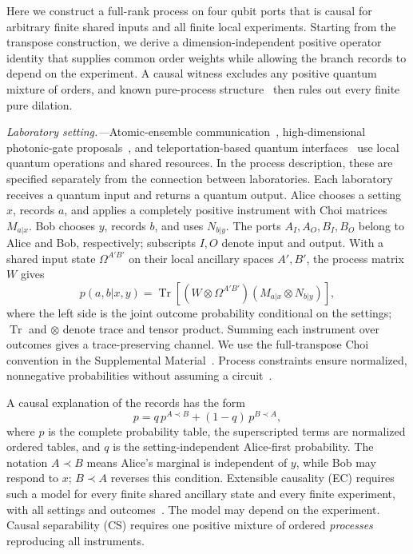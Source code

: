\documentclass[aps,prl,reprint,superscriptaddress,longbibliography,bibnotes,floatfix]{revtex4-2}
\newcommand{\Tr}{\operatorname{Tr}}
\begin{document}
Here we construct a full-rank process on four qubit ports that is causal for arbitrary finite shared inputs and all finite local experiments. Starting from the transpose construction, we derive a dimension-independent positive operator identity that supplies common order weights while allowing the branch records to depend on the experiment. A causal witness excludes any positive quantum mixture of orders, and known pure-process structure~\cite{Yokojima,Cyclic} then rules out every finite pure dilation.

\emph{Laboratory setting.---}Atomic-ensemble communication~\cite{DuanQuantumNetworks}, high-dimensional photonic-gate proposals~\cite{XiaPhotonicGate}, and teleportation-based quantum interfaces~\cite{ZhangTeleportation} use local quantum operations and shared resources. In the process description, these are specified separately from the connection between laboratories. Each laboratory receives a quantum input and returns a quantum output. Alice chooses a setting $x$, records $a$, and applies a completely positive instrument with Choi matrices $M_{a|x}$. Bob chooses $y$, records $b$, and uses $N_{b|y}$. The ports $A_I,A_O,B_I,B_O$ belong to Alice and Bob, respectively; subscripts $I,O$ denote input and output. With a shared input state $\Omega^{A'B'}$ on their local ancillary spaces $A',B'$, the process matrix $W$ gives
\begin{equation}
 p(a,b|x,y)=\Tr[(W\otimes\Omega^{A'B'})
                    (M_{a|x}\otimes N_{b|y})],
 \label{eq:born-main}
\end{equation}
where the left side is the joint outcome probability conditional on the settings; $\Tr$ and $\otimes$ denote trace and tensor product. Summing each instrument over outcomes gives a trace-preserving channel. We use the full-transpose Choi convention in the Supplemental Material~\cite{SM}. Process constraints ensure normalized, nonnegative probabilities without assuming a circuit~\cite{OCB}.

A causal explanation of the records has the form
\begin{equation}
 p=q\,p^{A\prec B}+(1-q)\,p^{B\prec A},
 \label{eq:causal-model}
\end{equation}
where $p$ is the complete probability table, the superscripted terms are normalized ordered tables, and $q$ is the setting-independent Alice-first probability. The notation $A\prec B$ means Alice's marginal is independent of $y$, while Bob may respond to $x$; $B\prec A$ reverses this condition. Extensible causality (EC) requires such a model for every finite shared ancillary state and every finite experiment, with all settings and outcomes~\cite{EC}. The model may depend on the experiment. Causal separability (CS) requires one positive mixture of ordered \emph{processes} reproducing all instruments.
\end{document}
